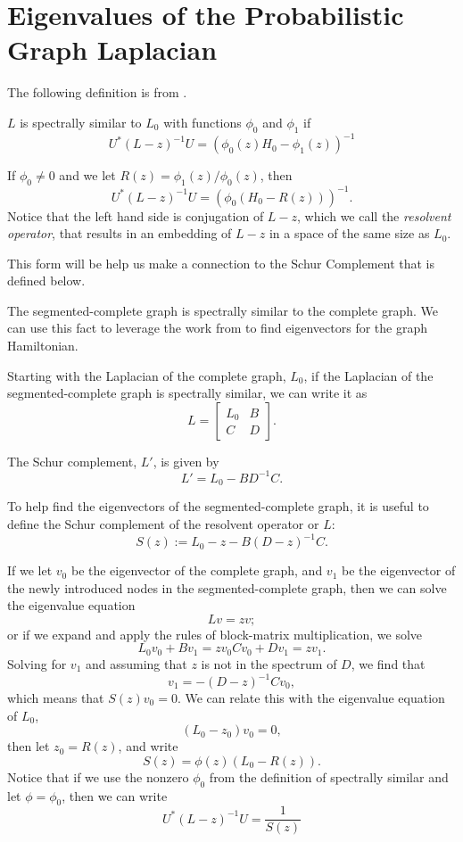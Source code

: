 \section{Eigenvalues of the Probabilistic Graph Laplacian}
The following definition is from \cite{SelfSimilarity}.
\begin{definition}
$L$ is spectrally similar to $L_0$ with functions $\phi_0$ and $\phi_1$ if
$$
U^*(L - z)^{-1}U = (\phi_0(z)H_0-\phi_1(z))^{-1}
$$

\end{definition}

If $\phi_0 \neq 0$ and we let $R(z) = \phi_1(z) / \phi_0(z)$, then 
$$
U^*(L - z)^{-1}U = (\phi_0(H_0-R(z)))^{-1}.
$$
Notice that the left hand side is conjugation of $L - z$, which we call the \textit{resolvent operator}, that results in an embedding of $L - z$ in a space of the same size as $L_0$.

This form will be help us make a connection to the Schur Complement that is defined below.

The segmented-complete graph is spectrally similar to the complete graph.
We can use this fact to leverage the work from \cite{VibrationModes} to find eigenvectors for the graph Hamiltonian.

Starting with the Laplacian of the complete graph, $L_0$, if the Laplacian of the segmented-complete graph is spectrally similar, we can write it as
$$
L = \begin{bmatrix}
L_0 & B \\
C   & D
\end{bmatrix}.
$$

\begin{definition}
The Schur complement, $L'$, is given by
$$
L' = L_0 - BD^{-1}C.
$$
\end{definition}

To help find the eigenvectors of the segmented-complete graph, it is useful to define the Schur complement of the resolvent operator or $L$:
$$
S(z) := L_0 - z - B(D-z)^{-1}C.
$$

If we let $v_0$ be the eigenvector of the complete graph, and $v_1$ be the eigenvector of the newly introduced nodes in the segmented-complete graph, then we can solve the eigenvalue equation
$$
Lv = zv;
$$
or if we expand and apply the rules of block-matrix multiplication, we solve
$$
L_0v_0 + Bv_1 = zv_0
Cv_0 + Dv_1 = zv_1.
$$
Solving for $v_1$ and assuming that $z$ is not in the spectrum of $D$, we find that
$$
v_1= -(D - z)^{-1}Cv_0,
$$
which means that $S(z)v_0=0$.
We can relate this with the eigenvalue equation of $L_0$,
$$
(L_0 - z_0)v_0 = 0,
$$
then let $z_0 = R(z)$, and write
$$
S(z) = \phi(z)(L_0 - R(z)).
$$
Notice that if we use the nonzero $\phi_0$ from the definition of spectrally similar and let $\phi = \phi_0$, then we can write
$$
U^*(L - z)^{-1}U = \frac{1}{S(z)}
$$

